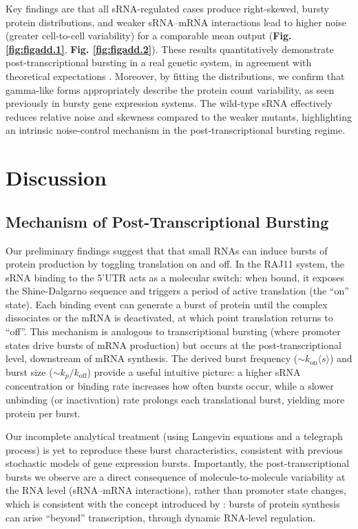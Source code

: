 Key findings are that all sRNA-regulated cases produce right-skewed, bursty protein distributions, and weaker sRNA--mRNA interactions lead to higher noise (greater cell-to-cell variability) for a comparable mean output (\textbf{Fig. \ref{fig:figadd.1}}, \textbf{Fig. \ref{fig:figadd.2}}). These results quantitatively demonstrate post-transcriptional bursting in a real genetic system, in agreement with theoretical expectations \cite{Rodrigo2018}. Moreover, by fitting the distributions, we confirm that gamma-like forms appropriately describe the protein count variability, as seen previously in bursty gene expression systems. The wild-type sRNA effectively reduces relative noise and skewness compared to the weaker mutants, highlighting an intrinsic noise-control mechanism in the post-transcriptional bursting regime.

\section*{Discussion}
\subsection*{Mechanism of Post-Transcriptional Bursting}
Our preliminary findings suggest that that small RNAs can induce bursts of protein production by toggling translation on and off. In the RAJ11 system, the sRNA binding to the 5'UTR acts as a molecular switch: when bound, it exposes the Shine-Dalgarno sequence and triggers a period of active translation (the ``on'' state). Each binding event can generate a burst of protein until the complex dissociates or the mRNA is deactivated, at which point translation returns to ``off''. This mechanism is analogous to transcriptional bursting (where promoter states drive bursts of mRNA production) but occurs at the post-transcriptional level, downstream of mRNA synthesis. The derived burst frequency ($\sim k_{\text{on}}\langle s \rangle$) and burst size ($\sim k_p/k_{\text{off}}$) provide a useful intuitive picture: a higher sRNA concentration or binding rate increases how often bursts occur, while a slower unbinding (or inactivation) rate prolongs each translational burst, yielding more protein per burst.

Our incomplete analytical treatment (using Langevin equations and a telegraph process) is yet to reproduce these burst characteristics, consistent with previous stochastic models of gene expression bursts. Importantly, the post-transcriptional bursts we observe are a direct consequence of molecule-to-molecule variability at the RNA level (sRNA--mRNA interactions), rather than promoter state changes, which is consistent with the concept introduced by \cite{Rodrigo2018}: bursts of protein synthesis can arise ``beyond'' transcription, through dynamic RNA-level regulation.

